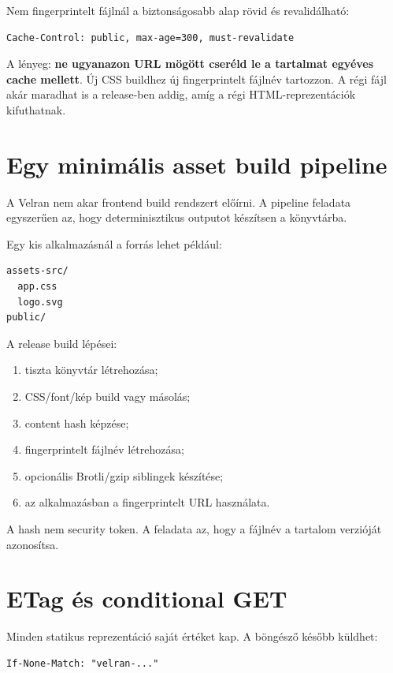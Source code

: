 Nem fingerprintelt fájlnál a biztonságosabb alap rövid és revalidálható:

\begin{lstlisting}
Cache-Control: public, max-age=300, must-revalidate
\end{lstlisting}

A lényeg: \textbf{ne ugyanazon URL mögött cseréld le a tartalmat egyéves cache mellett}. Új CSS buildhez új fingerprintelt fájlnév tartozzon. A régi fájl akár maradhat is a release-ben addig, amíg a régi HTML-reprezentációk kifuthatnak.

\section{Egy minimális asset build pipeline}

A Velran nem akar frontend build rendszert előírni. A pipeline feladata egyszerűen az, hogy determinisztikus outputot készítsen a  könyvtárba.

Egy kis alkalmazásnál a forrás lehet például:

\begin{lstlisting}
assets-src/
  app.css
  logo.svg
public/
\end{lstlisting}

A release build lépései:

\begin{enumerate}
  \item tiszta  könyvtár létrehozása;
  \item CSS/font/kép build vagy másolás;
  \item content hash képzése;
  \item fingerprintelt fájlnév létrehozása;
  \item opcionális Brotli/gzip siblingek készítése;
  \item az alkalmazásban a fingerprintelt URL használata.
\end{enumerate}

A hash nem security token. A feladata az, hogy a fájlnév a tartalom verzióját azonosítsa.

\section{ETag és conditional GET}

Minden statikus reprezentáció saját  értéket kap. A böngésző később küldhet:

\begin{lstlisting}
If-None-Match: "velran-..."
\end{lstlisting}

